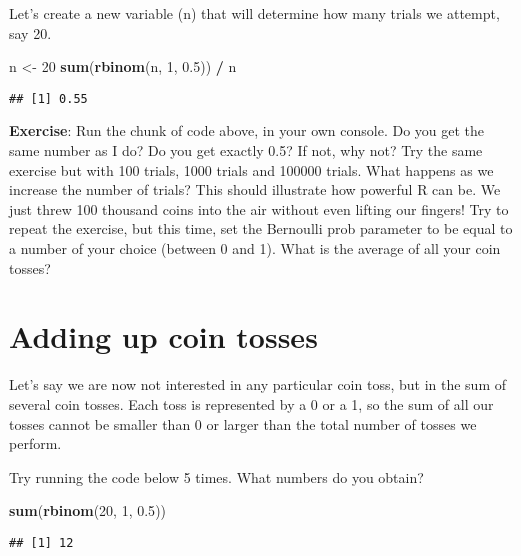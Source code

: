 \documentclass[
]{book}
\newenvironment{Shaded}{\begin{snugshade}}{\end{snugshade}}
\newcommand{\DecValTok}[1]{\textcolor[rgb]{0.00,0.00,0.81}{#1}}
\newcommand{\FloatTok}[1]{\textcolor[rgb]{0.00,0.00,0.81}{#1}}
\newcommand{\KeywordTok}[1]{\textcolor[rgb]{0.13,0.29,0.53}{\textbf{#1}}}
\newcommand{\NormalTok}[1]{#1}
\newcommand{\OperatorTok}[1]{\textcolor[rgb]{0.81,0.36,0.00}{\textbf{#1}}}
\newcommand{\StringTok}[1]{\textcolor[rgb]{0.31,0.60,0.02}{#1}}
\begin{document}
Let's create a new variable (n) that will determine how many trials we attempt, say 20.

\begin{Shaded}
\begin{Highlighting}[]
\NormalTok{n \textless{}{-}}\StringTok{ }\DecValTok{20}
\KeywordTok{sum}\NormalTok{(}\KeywordTok{rbinom}\NormalTok{(n, }\DecValTok{1}\NormalTok{, }\FloatTok{0.5}\NormalTok{)) }\OperatorTok{/}\StringTok{ }\NormalTok{n}
\end{Highlighting}
\end{Shaded}

\begin{verbatim}
## [1] 0.55
\end{verbatim}

\textbf{Exercise}: Run the chunk of code above, in your own console. Do you get the same number as I do? Do you get exactly 0.5? If not, why not? Try the same exercise but with 100 trials, 1000 trials and 100000 trials. What happens as we increase the number of trials? This should illustrate how powerful R can be. We just threw 100 thousand coins into the air without even lifting our fingers! Try to repeat the exercise, but this time, set the Bernoulli prob parameter to be equal to a number of your choice (between 0 and 1). What is the average of all your coin tosses?

\hypertarget{adding-up-coin-tosses}{%
\section{Adding up coin tosses}\label{adding-up-coin-tosses}}

Let's say we are now not interested in any particular coin toss, but in the sum of several coin tosses. Each toss is represented by a 0 or a 1, so the sum of all our tosses cannot be smaller than 0 or larger than the total number of tosses we perform.

Try running the code below 5 times. What numbers do you obtain?

\begin{Shaded}
\begin{Highlighting}[]
\KeywordTok{sum}\NormalTok{(}\KeywordTok{rbinom}\NormalTok{(}\DecValTok{20}\NormalTok{, }\DecValTok{1}\NormalTok{, }\FloatTok{0.5}\NormalTok{))}
\end{Highlighting}
\end{Shaded}

\begin{verbatim}
## [1] 12
\end{verbatim}
\end{document}

